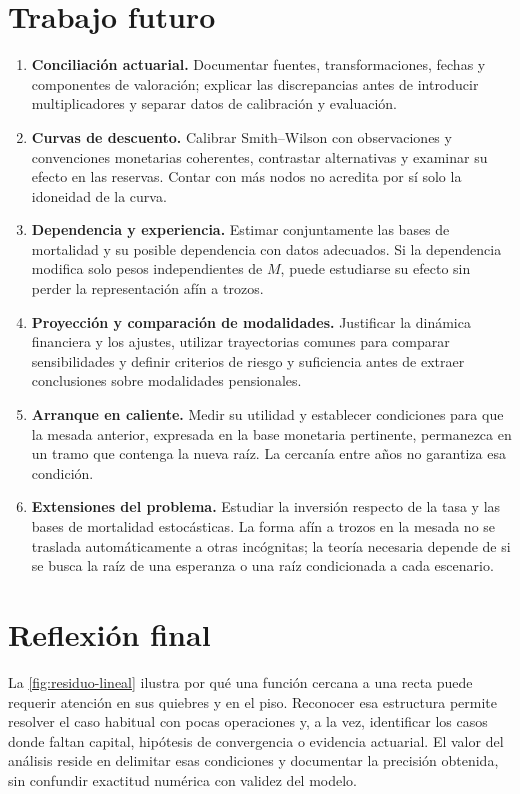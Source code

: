 \section{Trabajo futuro}

\begin{enumerate}[leftmargin=*]
  \item \textbf{Conciliación actuarial.} Documentar fuentes, transformaciones,
        fechas y componentes de valoración; explicar las discrepancias antes de
        introducir multiplicadores y separar datos de calibración y evaluación.

  \item \textbf{Curvas de descuento.} Calibrar Smith--Wilson con observaciones y
        convenciones monetarias coherentes, contrastar alternativas y examinar
        su efecto en las reservas. Contar con más nodos no acredita por sí solo
        la idoneidad de la curva.

  \item \textbf{Dependencia y experiencia.} Estimar conjuntamente las bases de
        mortalidad y su posible dependencia con datos adecuados. Si la
        dependencia modifica solo pesos independientes de $M$, puede estudiarse
        su efecto sin perder la representación afín a trozos.

  \item \textbf{Proyección y comparación de modalidades.} Justificar la dinámica
        financiera y los ajustes, utilizar trayectorias comunes para comparar
        sensibilidades y definir criterios de riesgo y suficiencia antes de
        extraer conclusiones sobre modalidades pensionales.

  \item \textbf{Arranque en caliente.} Medir su utilidad y establecer condiciones
        para que la mesada anterior, expresada en la base monetaria pertinente,
        permanezca en un tramo que contenga la nueva raíz. La cercanía entre años
        no garantiza esa condición.

  \item \textbf{Extensiones del problema.} Estudiar la inversión respecto de la
        tasa y las bases de mortalidad estocásticas. La forma afín a trozos en la
        mesada no se traslada automáticamente a otras incógnitas; la teoría
        necesaria depende de si se busca la raíz de una esperanza o una raíz
        condicionada a cada escenario.
\end{enumerate}

\section{Reflexión final}

La \cref{fig:residuo-lineal} ilustra por qué una función cercana a una recta puede
requerir atención en sus quiebres y en el piso. Reconocer esa estructura permite
resolver el caso habitual con pocas operaciones y, a la vez, identificar los
casos donde faltan capital, hipótesis de convergencia o evidencia actuarial. El
valor del análisis reside en delimitar esas condiciones y documentar la precisión
obtenida, sin confundir exactitud numérica con validez del modelo.
